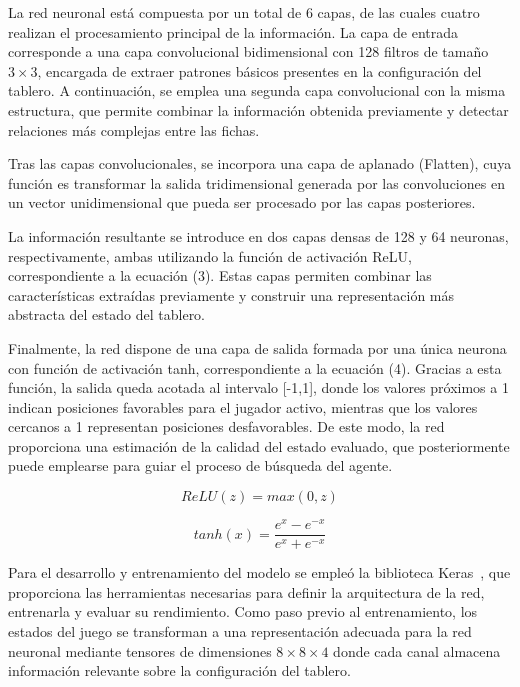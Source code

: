 \documentclass[conference,a4paper]{IEEEtran}
\begin{document}
La red neuronal está compuesta por un total de 6 capas, de las cuales cuatro realizan el procesamiento principal de la información. 
La capa de entrada corresponde a una capa convolucional bidimensional con 128 filtros de tamaño $3\times3$, encargada de extraer patrones básicos presentes en la configuración del tablero. 
A continuación, se emplea una segunda capa convolucional con la misma estructura, que permite combinar la información obtenida previamente y detectar relaciones más complejas entre las fichas. 

Tras las capas convolucionales, se incorpora una capa de aplanado (Flatten), cuya función es transformar la salida tridimensional generada por las convoluciones en un vector unidimensional que pueda ser procesado por las capas posteriores. 

La información resultante se introduce en dos capas densas de 128 y 64 neuronas, respectivamente, ambas utilizando la función de activación ReLU, correspondiente a la ecuación (3). 
Estas capas permiten combinar las características extraídas previamente y construir una representación más abstracta del estado del tablero. 

Finalmente, la red dispone de una capa de salida formada por una única neurona con función de activación tanh, correspondiente a la ecuación (4). 
Gracias a esta función, la salida queda acotada al intervalo [-1,1], donde los valores próximos a 1 indican posiciones favorables para el jugador activo, mientras que los valores cercanos a 1 representan posiciones desfavorables. 
De este modo, la red proporciona una estimación de la calidad del estado evaluado, que posteriormente puede emplearse para guiar el proceso de búsqueda del agente. 

\begin{equation}
  \label{eq:relu}
  ReLU(z)=max(0,z) 
\end{equation}

\begin{equation}
  \label{eq:tanh}
  tanh(x)=\frac{e^{x}-e^{-x}}{e^{x}+e^{-x}} 
\end{equation}

Para el desarrollo y entrenamiento del modelo se empleó la biblioteca Keras~\cite{b12}, que proporciona las herramientas necesarias para definir la arquitectura de la red, entrenarla y evaluar su rendimiento. 
Como paso previo al entrenamiento, los estados del juego se transforman a una representación adecuada para la red neuronal mediante tensores de dimensiones $8\times8\times4$ donde cada canal almacena información relevante sobre la configuración del tablero. 
\end{document}
